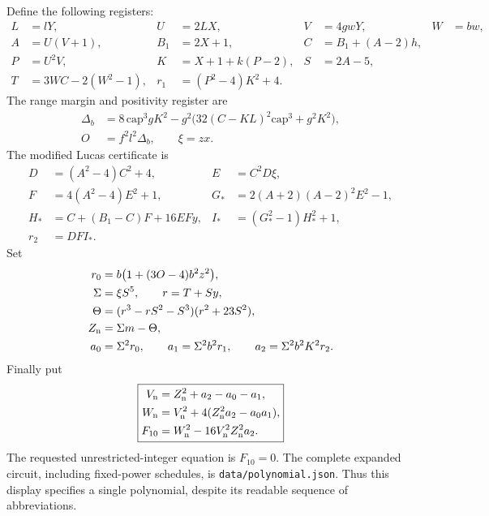 \documentclass[11pt,letterpaper]{article}
\theoremstyle{remark}\newtheorem{remark}[theorem]{Remark}
\newcommand{\file}[1]{\nolinkurl{#1}}
\begin{document}
Define the following registers:
\begin{align*}
 L&=lY,& U&=2LX,& V&=4gwY,& W&=bw,\\
 A&=U(V+1),& B_1&=2X+1,& C&=B_1+(A-2)h,\\
 P&=U^2V,& K&=X+1+k(P-2),& S&=2A-5,\\
 T&=3WC-2(W^2-1),&
 r_1&=(P^2-4)K^2+4.
\end{align*}
The range margin and positivity register are
\begin{align*}
 \Delta_b&=8\,\mathrm{cap}^3gK^2
 -g^2\bigl(32(C-KL)^2\mathrm{cap}^3+g^2K^2\bigr),\\
 O&=f^2l^2\Delta_b,\qquad \xi=zx.
\end{align*}
The modified Lucas certificate is
\begin{align*}
 D&=(A^2-4)C^2+4,& E&=C^2D\xi,\\
 F&=4(A^2-4)E^2+1,&
 G_*&=2(A+2)(A-2)^2E^2-1,\\
 H_*&=C+(B_1-C)F+16EFy,&
 I_*&=(G_*^2-1)H_*^2+1,\\
 r_2&=DFI_*.
\end{align*}
Set
\begin{align*}
 r_0&=b\bigl(1+(3O-4)b^2z^2\bigr),\\
 \Sigma&=\xi S^5,\qquad r=T+Sy,\\
 \Theta&=(r^3-rS^2-S^3)(r^2+23S^2),\\
 Z_{\rm n}&=\Sigma m-\Theta,\\
 a_0&=\Sigma^2r_0,\qquad
 a_1=\Sigma^2b^2r_1,\qquad
 a_2=\Sigma^2b^2K^2r_2.
\end{align*}
Finally put
\begin{equation}\label{eq:ten-polynomial}
\boxed{\begin{aligned}
 V_{\rm n}&=Z_{\rm n}^2+a_2-a_0-a_1,\\
 W_{\rm n}&=V_{\rm n}^2+4(Z_{\rm n}^2a_2-a_0a_1),\\
 F_{10}&=W_{\rm n}^2-16V_{\rm n}^2Z_{\rm n}^2a_2.
\end{aligned}}
\end{equation}
The requested unrestricted-integer equation is $F_{10}=0$.
The complete expanded circuit, including fixed-power schedules, is
\file{data/polynomial.json}. Thus this display specifies a single
polynomial, despite its readable sequence of abbreviations.
\end{document}
